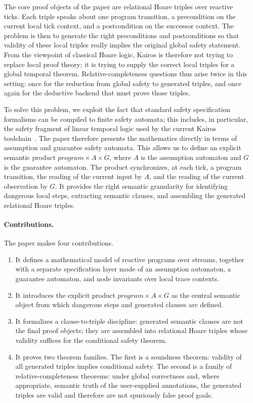 \documentclass[11pt,a4paper]{article}
\begin{document}
The core proof objects of the paper are relational Hoare triples over reactive
ticks. Each triple speaks about one program transition, a precondition on the
current local tick context, and a postcondition on the successor context. The
problem is then to generate the right preconditions and postconditions so that
validity of these local triples really implies the original global safety
statement. From the viewpoint of classical Hoare logic, Kairos is therefore not
trying to replace local proof theory; it is trying to supply the correct local
triples for a global temporal theorem. Relative-completeness questions thus
arise twice in this setting: once for the reduction from global safety to
generated triples, and once again for the deductive backend that must prove
those triples.

To solve this problem, we exploit the fact that standard safety specification
formalisms can be compiled to finite safety automata; this includes, in
particular, the safety fragment of linear temporal logic used by the current
Kairos toolchain~\cite{kupferman-vardi-safety,gastin-oddoux}. The paper
therefore presents the mathematics directly in terms of assumption and
guarantee safety automata. This allows us to define an explicit semantic
product \(program \times A \times G\), where \(A\) is the assumption automaton
and \(G\) is the guarantee automaton. The product synchronizes, at each tick, a
program transition, the reading of the current input by \(A\), and the reading
of the current observation by \(G\). It provides the right semantic granularity
for identifying dangerous local steps, extracting semantic clauses, and
assembling the generated relational Hoare triples.

\paragraph{Contributions.}
The paper makes four contributions.
\begin{enumerate}[leftmargin=1.4em]
\item It defines a mathematical model of reactive programs over streams,
  together with a separate specification layer made of an assumption automaton,
  a guarantee automaton, and node invariants over local trace contexts.
\item It introduces the explicit product \(program \times A \times G\) as the
  central semantic object from which dangerous steps and generated clauses are
  defined.
\item It formalizes a clause-to-triple discipline: generated semantic clauses
  are not the final proof objects; they are assembled into relational Hoare
  triples whose validity suffices for the conditional safety theorem.
\item It proves two theorem families. The first is a soundness theorem:
  validity of all generated triples implies conditional safety. The second is a
  family of relative-completeness theorems: under global correctness and, where
  appropriate, semantic truth of the user-supplied annotations, the generated
  triples are valid and therefore are not spuriously false proof goals.
\end{enumerate}
\end{document}
